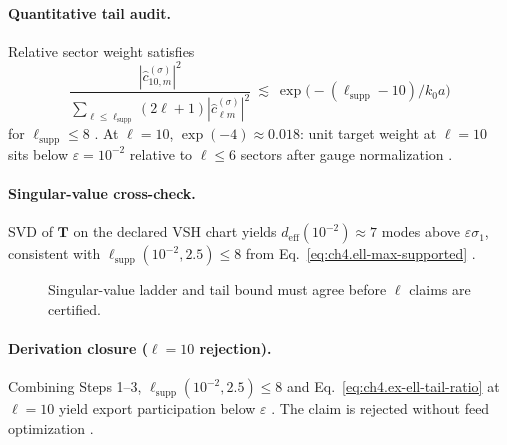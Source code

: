 \paragraph{Quantitative tail audit.}
Relative sector weight satisfies
\begin{equation}
\label{eq:ch4.ex-ell-tail-ratio}
\frac{|\widehat{c}_{10,m}^{(\sigma)}|^{2}}{\sum_{\ell\le\ell_{\mathrm{supp}}}(2\ell+1)|\widehat{c}_{\ell m}^{(\sigma)}|^{2}}
\ \lesssim\
\exp\!\bigl(-(\ell_{\mathrm{supp}}-10)/k_{0}a\bigr)
\end{equation}
for \(\ell_{\mathrm{supp}}\le8\) \cite{hansen1988,jackson1999,harrington2001}. At \(\ell=10\), \(\exp(-4)\approx0.018\): unit target weight at \(\ell=10\) sits below
\(\varepsilon=10^{-2}\) relative to \(\ell\le6\) sectors after gauge normalization \cite{devaney2004,stratton1941}.

\paragraph{Singular-value cross-check.}
SVD of \(\mathbf{T}\) on the declared VSH chart yields \(d_{\mathrm{eff}}(10^{-2})\approx7\) modes above \(\varepsilon\sigma_{1}\), consistent with
\(\ell_{\mathrm{supp}}(10^{-2},2.5)\le8\) from Eq.~\eqref{eq:ch4.ell-max-supported} \cite{harrington2001,hansen1988,devaney2004,stratton1941}.

\begin{figure}[t]
\centering
{}
\caption{Singular-value ladder and tail bound must agree before \(\ell\) claims are certified.}
\label{fig:ch4.ex-ell-svd-crosscheck}
\end{figure}

\paragraph{Derivation closure (\(\ell=10\) rejection).}
Combining Steps 1--3, \(\ell_{\mathrm{supp}}(10^{-2},2.5)\le8\) and Eq.~\eqref{eq:ch4.ex-ell-tail-ratio} at \(\ell=10\) yield export participation below \(\varepsilon\)
\cite{hansen1988,harrington2001,devaney2004,stratton1941}. The claim is rejected without feed optimization \cite{jackson1999}.

